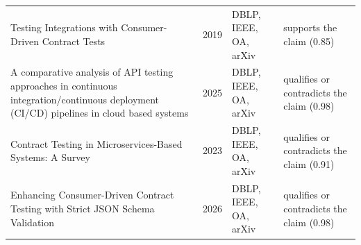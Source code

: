 \begin{longtable}{@{}%
  >{\raggedright\arraybackslash}p{}c%
  >{\raggedright\arraybackslash}p{}%
  >{\raggedright\arraybackslash}p{}@{}}
Testing Integrations with Consumer-Driven Contract Tests & 2019 & DBLP, IEEE, OA, arXiv & supports the claim (0.85) \\
A comparative analysis of API testing approaches in continuous integration/continuous deployment (CI/CD) pipelines in cloud based systems & 2025 & DBLP, IEEE, OA, arXiv & qualifies or contradicts the claim (0.98) \\
Contract Testing in Microservices-Based Systems: A Survey & 2023 & DBLP, IEEE, OA, arXiv & qualifies or contradicts the claim (0.91) \\
Enhancing Consumer-Driven Contract Testing with Strict JSON Schema Validation & 2026 & DBLP, IEEE, OA, arXiv & qualifies or contradicts the claim (0.98) \\
\end{longtable}
\endgroup
